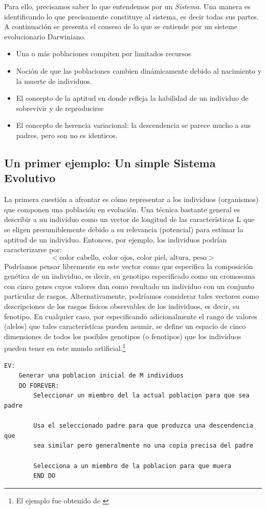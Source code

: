 \documentclass{article}
\begin{document}
Para ello, precisamos saber lo que entendemos por un \textit{Sistema}. Una manera es identificando lo que precisamente constituye al sistema, es decir todas sus partes. A continuaci\'on se presenta el conseso de lo que se entiende por un sisteme evolucionario Darwiniano.
\begin{itemize}
    \item Una o m\'as poblaciones compiten por limitados recursos
    \item Noci\'on de que las poblaciones cambien din\'amicamente debido al nacimiento y la muerte de individuos.
    \item El concepto de la aptitud en donde refleja la habilidad de un individuo de sobrevivir y de reproducirse
    \item El concepto de  herencia variacional: la descendencia se parece mucho a sus padres, pero son no es identicos.
\end{itemize}
\subsection{Un primer ejemplo: Un simple Sistema Evolutivo}
La primera cuestión a afrontar es cómo representar a los individuos (organismos) que componen una población en evolución. Una técnica bastante general es describir a un individuo como un vector de longitud de las características L que se eligen presumiblemente debido a su relevancia (potencial) para estimar la aptitud de un individuo. Entonces, por ejemplo, los individuos podrían caracterizarse por:
\begin{equation*}
    < \textrm{color cabello, color ojos, color piel, altura, peso}>
\end{equation*}
Podríamos pensar libremente en este vector como que especifica la composición genética de un individuo, es decir, su genotipo especificado como un cromosoma con cinco genes cuyos valores dan como resultado un individuo con un conjunto particular de rasgos. Alternativamente, podríamos considerar tales vectores como descripciones de los rasgos físicos observables de los individuos, es decir, su fenotipo. En cualquier caso, por especificando adicionalmente el rango de valores (alelos) que tales características pueden asumir, se define un espacio de cinco dimensiones de todos los posibles genotipos (o fenotipos) que los individuos pueden tener en este mundo artificial.\footnote{El ejemplo fue obtenido de \cite{Cuevas (2016)}}
\begin{verbatim}
EV:
    Generar una poblacion inicial de M individuos
    DO FOREVER:
        Seleccionar un miembro del la actual poblacion para que sea padre
        
        Usa el seleccionado padre para que produzca una descendencia que
        sea similar pero generalmente no una copia precisa del padre
        
        Selecciona a un miembro de la poblacion para que muera
        END DO
\end{verbatim}
\end{document}
